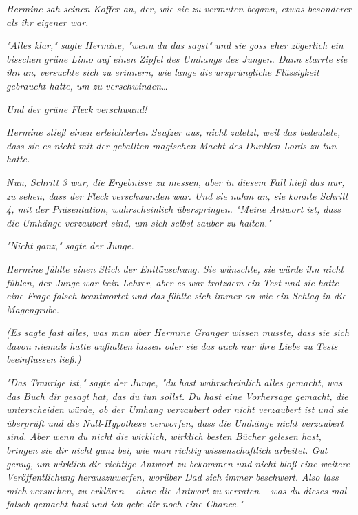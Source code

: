 {\emph{Hermine sah seinen Koffer an, der, wie sie zu vermuten begann, etwas besonderer als ihr eigener war.}

\emph{"Alles klar," sagte Hermine, "wenn du das sagst" und sie goss eher zögerlich ein bisschen grüne Limo auf einen Zipfel des Umhangs des Jungen. Dann starrte sie ihn an, versuchte sich zu erinnern, wie lange die} \emph{ursprüngliche Flüssigkeit gebraucht hatte, um zu verschwinden…}

\emph{Und der grüne Fleck verschwand!}

\emph{Hermine stieß einen erleichterten Seufzer aus, nicht zuletzt, weil das bedeutete, dass sie es nicht mit der} \emph{geballten} \emph{magischen Macht des Dunklen Lords zu tun hatte.}

\emph{Nun, Schritt 3 war, die Ergebnisse zu messen, aber in diesem Fall hieß das nur, zu sehen, dass der Fleck verschwunden war. Und sie nahm an, sie konnte Schritt 4, mit der Präsentation, wahrscheinlich überspringen. "Meine Antwort ist, dass die Umhänge verzaubert sind, um sich selbst sauber zu halten."}

\emph{"Nicht ganz," sagte der Junge.}

\emph{Hermine fühlte einen} \emph{Stich der Enttäuschung. Sie wünschte, sie} \emph{\emph{würde}} \emph{ihn nicht fühlen, der Junge war kein Lehrer, aber es war trotzdem ein Test und sie hatte eine Frage falsch beantwortet und das fühlte sich immer an wie ein Schlag in die Magengrube.}

\emph{(Es sagte fast alles, was man über Hermine Granger wissen musste, dass sie sich davon niemals hatte aufhalten lassen oder sie das auch nur ihre Liebe zu Tests beeinflussen ließ.)}

\emph{"Das Traurige ist," sagte der Junge, "du hast wahrscheinlich alles gemacht, was das Buch dir gesagt hat, das du tun sollst. Du hast eine Vorhersage gemacht, die unterscheiden würde, ob der Umhang verzaubert oder nicht verzaubert ist und sie überprüft und die Null-Hypothese verworfen, dass die Umhänge nicht verzaubert sind. Aber wenn du nicht die wirklich, wirklich besten Bücher gelesen hast, bringen sie dir nicht ganz bei, wie man} \emph{\emph{richtig}} \emph{wissenschaftlich arbeitet. Gut genug, um} \emph{\emph{wirklich}} \emph{die richtige Antwort zu bekommen und nicht bloß eine weitere Veröffentlichung herauszuwerfen, worüber Dad sich immer beschwert. Also lass mich versuchen, zu erklären -- ohne die Antwort zu verraten -- was du dieses mal falsch gemacht hast und ich gebe dir noch eine Chance."}

}
